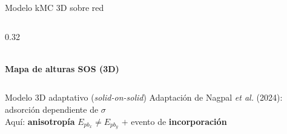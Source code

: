 \documentclass[aspectratio=169,11pt]{beamer}
\begin{document}
\begin{frame}{Modelo kMC 3D sobre red}
\begin{columns}[T,onlytextwidth]
\begin{column}{0.32\textwidth}
      \centering
      \\[0.2em]
      {\color{azul}\bfseries\small Mapa de alturas SOS (3D)}\par
    \end{column}
  \end{columns}
  \vspace{0.4em}
  \begin{center}
    \begin{minipage}{0.80\textwidth}
      \begin{block}{Modelo 3D adaptativo (\textit{solid-on-solid})}
        \footnotesize Adaptación de Nagpal \emph{et al.} (2024): adsorción dependiente de $\sigma$\\
        Aquí: \textbf{anisotropía} $E_{pb_x}\neq E_{pb_y}$ $+$ evento de \textbf{incorporación}
      \end{block}
    \end{minipage}
  \end{center}
\end{frame}
\end{document}

